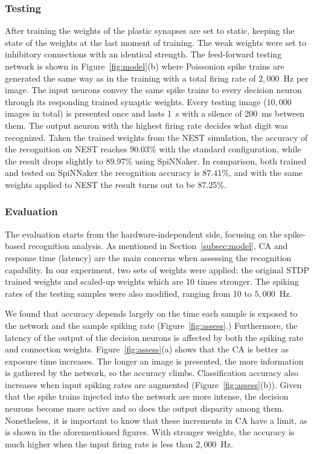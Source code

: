 \documentclass{frontiersENG} %
\begin{document}
\subsubsection{Testing}
After training the weights of the plastic synapses are set to static, keeping the state of the weights at the last moment of training.
The weak weights were set to inhibitory connections with an identical strength.
The feed-forward testing network is shown in Figure~\ref{fig:model}(b) where Poissonion spike trains are generated the same way as in the training with a total firing rate of $2,000$~Hz per image.
The input neurons convey the same spike trains to every decision neuron through its responding trained synaptic weights. 
Every testing image ($10,000$ images in total) is presented once and lasts 1~s with a silence of 200~ms between them.
The output neuron with the highest firing rate decides what digit was recognized.
Taken the trained weights from the NEST simulation, the accuracy of the recognition on NEST reaches 90.03\% with the standard configuration, while the result drops slightly to 89.97\% using SpiNNaker.
In comparison, both trained and tested on SpiNNaker the recognition accuracy is 87.41\%, and with the same weights applied to NEST the result turns out to be 87.25\%. 

\subsubsection{Evaluation}
The evaluation starts from the hardware-independent side, focusing on the spike-based recognition analysis.
As mentioned in Section~\ref{subsec:model}, CA and response time (latency) are the main concerns when assessing the recognition capability.
In our experiment, two sets of weights were applied: the original STDP trained weights and scaled-up weights which are 10 times stronger.
The spiking rates of the testing samples were also modified, ranging from 10 to $5,000$~Hz.

We found that accuracy depends largely on the time each sample is exposed to the network and the sample spiking rate (Figure~\ref{fig:assess}.)
Furthermore, the latency of the output of the decision neurons is affected by both the spiking rate and connection weights.
Figure~\ref{fig:assess}(a) shows that the CA is better as exposure time increases. The longer an image is presented, the more information is gathered by the network, so the accuracy climbs.
Classification accuracy also increases when input spiking rates are augmented (Figure~\ref{fig:assess}(b)).
Given that the spike trains injected into the network are more intense, the decision neurons become more active and so does the output disparity among them.
Nonetheless, it is important to know that these increments in CA have a limit, as is shown in the aforementioned figures.
With stronger weights, the accuracy is much higher when the input firing rate is less than $2,000$~Hz.
\end{document}
